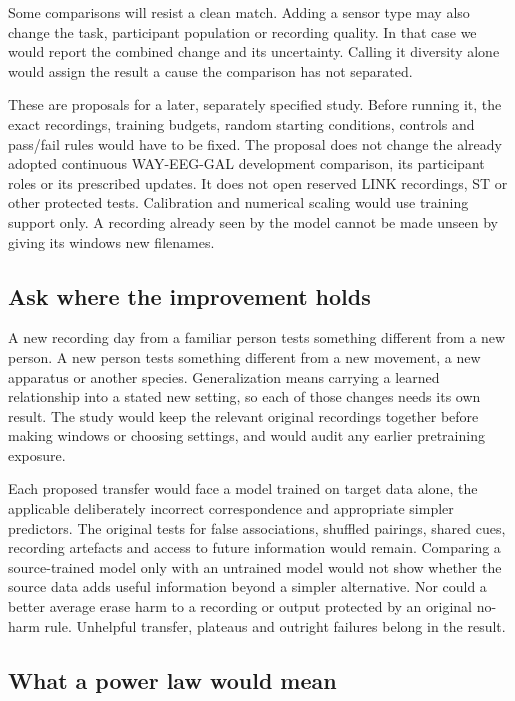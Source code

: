 Some comparisons will resist a clean match. Adding a sensor type may also change the task, participant population or recording quality. In that case we would report the combined change and its uncertainty. Calling it diversity alone would assign the result a cause the comparison has not separated.

These are proposals for a later, separately specified study. Before running it, the exact recordings, training budgets, random starting conditions, controls and pass/fail rules would have to be fixed. The proposal does not change the already adopted continuous WAY-EEG-GAL development comparison, its participant roles or its prescribed updates. It does not open reserved LINK recordings, ST or other protected tests. Calibration and numerical scaling would use training support only. A recording already seen by the model cannot be made unseen by giving its windows new filenames.

\subsection{Ask where the improvement holds}

A new recording day from a familiar person tests something different from a new person. A new person tests something different from a new movement, a new apparatus or another species. Generalization means carrying a learned relationship into a stated new setting, so each of those changes needs its own result. The study would keep the relevant original recordings together before making windows or choosing settings, and would audit any earlier pretraining exposure.

Each proposed transfer would face a model trained on target data alone, the applicable deliberately incorrect correspondence and appropriate simpler predictors. The original tests for false associations, shuffled pairings, shared cues, recording artefacts and access to future information would remain. Comparing a source-trained model only with an untrained model would not show whether the source data adds useful information beyond a simpler alternative. Nor could a better average erase harm to a recording or output protected by an original no-harm rule. Unhelpful transfer, plateaus and outright failures belong in the result.

\subsection{What a power law would mean}

